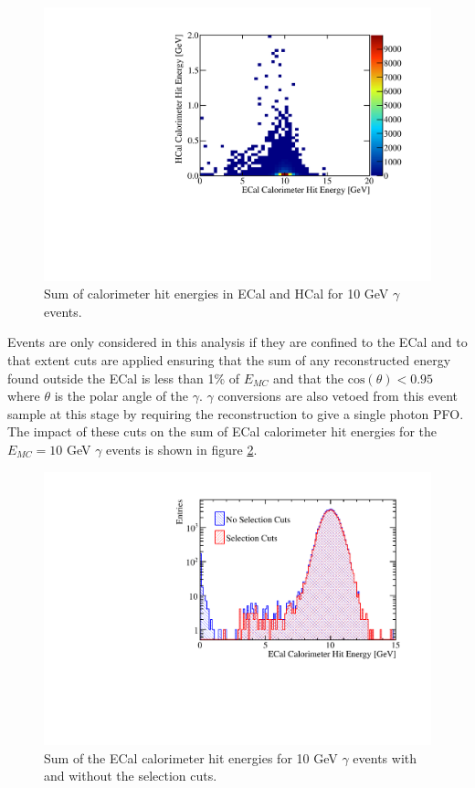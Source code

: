 \begin{figure}
\includegraphics[width=\largefigwidth]{EnergyEstimators/Plots/Calibration/Digitsation/ECal/ECalHCalPhotonSplit.pdf}
\caption[Sum of calorimeter hit energies in ECal and HCal for 10 GeV $\gamma$ events.]{Sum of calorimeter hit energies in ECal and HCal for 10 GeV $\gamma$ events.}
\label{fig:ecaldigiphotonsplit}
\end{figure}

Events are only considered in this analysis if they are confined to the ECal and to that extent cuts are applied ensuring that the sum of any reconstructed energy found outside the ECal is less than 1\% of $E_{MC}$ and that the $\text{cos}(\theta) < 0.95$ where $\theta$ is the polar angle of the $\gamma$.  $\gamma$ conversions are also vetoed from this event sample at this stage by requiring the reconstruction to give a single photon PFO.  The impact of these cuts on the sum of ECal calorimeter hit energies for the $E_{MC} = 10$ GeV $\gamma$ events is shown in figure \ref{fig:ecaldigiselection}.

\begin{figure}
\includegraphics[width=\largefigwidth]{EnergyEstimators/Plots/Calibration/Digitsation/ECal/DigitisationECalSelection.pdf}
\caption[Sum of the ECal calorimeter hit energies for 10 GeV $\gamma$ events with and without the selection cuts.]{Sum of the ECal calorimeter hit energies for 10 GeV $\gamma$ events with and without the selection cuts.}
\label{fig:ecaldigiselection}
\end{figure}

